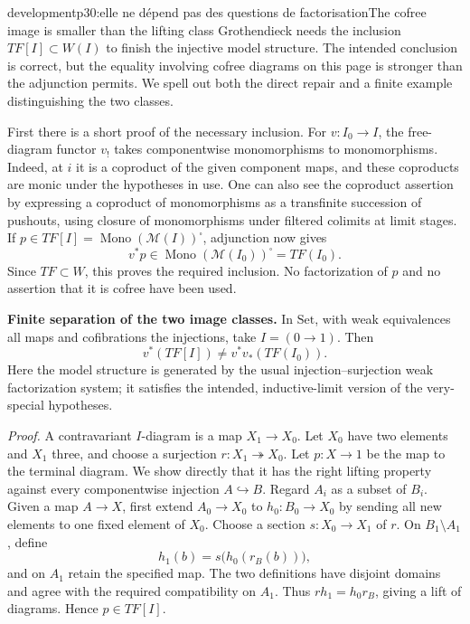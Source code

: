 \begin{dcomment}{development}{p30:elle ne dépend pas des questions de factorisation}{The cofree image is smaller than the lifting class}
Grothendieck needs the inclusion $TF[I]\subset W(I)$ to finish the injective model structure. The intended conclusion is correct, but the equality involving cofree diagrams on this page is stronger than the adjunction permits. We spell out both the direct repair and a finite example distinguishing the two classes.

First there is a short proof of the necessary inclusion. For $v:I_0\to I$, the free-diagram functor $v_!$ takes componentwise monomorphisms to monomorphisms. Indeed, at $i$ it is a coproduct of the given component maps, and these coproducts are monic under the hypotheses in use. One can also see the coproduct assertion by expressing a coproduct of monomorphisms as a transfinite succession of pushouts, using closure of monomorphisms under filtered colimits at limit stages. If $p\in TF[I]=\operatorname{Mono}(\mathcal M(I))^{\square}$, adjunction now gives
\[
 v^*p\in\operatorname{Mono}(\mathcal M(I_0))^{\square}=TF(I_0).
\]
Since $TF\subset W$, this proves the required inclusion. No factorization of $p$ and no assertion that it is cofree have been used.

\textbf{Finite separation of the two image classes.}\ours
In $\mathrm{Set}$, with weak equivalences all maps and cofibrations the injections, take $I=(0\to1)$. Then
\[
 v^*(TF[I])\ne v^*v_*(TF(I_0)).
\]
Here the model structure is generated by the usual injection--surjection weak factorization system; it satisfies the intended, inductive-limit version of the very-special hypotheses.

\emph{Proof.} A contravariant $I$-diagram is a map $X_1\to X_0$. Let $X_0$ have two elements and $X_1$ three, and choose a surjection $r:X_1\twoheadrightarrow X_0$. Let $p:X\to1$ be the map to the terminal diagram. We show directly that it has the right lifting property against every componentwise injection $A\hookrightarrow B$. Regard $A_i$ as a subset of $B_i$. Given a map $A\to X$, first extend $A_0\to X_0$ to $h_0:B_0\to X_0$ by sending all new elements to one fixed element of $X_0$. Choose a section $s:X_0\to X_1$ of $r$. On $B_1\setminus A_1$, define
\[
 h_1(b)=s\bigl(h_0(r_B(b))\bigr),
\]
and on $A_1$ retain the specified map. The two definitions have disjoint domains and agree with the required compatibility on $A_1$. Thus $rh_1=h_0r_B$, giving a lift of diagrams. Hence $p\in TF[I]$.


\end{dcomment}
